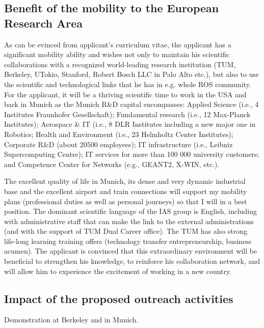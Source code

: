 \subsection{Benefit of the mobility to the European Research Area} 
As  can be  evinced from  applicant's curriculum  vitae, the applicant  
has  a significant mobility  ability  and  wishes  not  only to  maintain  his  scientific
collaborations  with a  recognized world-leading  research institution
(TUM, Berkeley, UTokio, Stanford, Robert Bosch LLC in Palo
Alto etc.), but also  to use the  scientific and  technological links
that he has in e.g. whole ROS community. For the applicant, it will  be 
a thriving scientific time to work in  the USA and back in Munich as  
the Munich R\&D capital encompasses:   Applied   Science   (i.e.,  4   Institutes   Fraunhofer
Gesellschaft); Fundamental research  (i.e., 12 Max-Planck Institutes);
Aerospace \&  IT (i.e., 8 DLR  Institutes including a new  major one in
Robotics;   Health  and   Environment  (i.e.,   23   Helmholtz  Center
Institutes); Corporate R\&D  (about 20500 employees); IT infrastructure
(i.e., Leibniz  Supercomputing Centre); IT services for  more than 100
000 university  customers; and  Competence Center for  Networks (e.g.,
GEANT2, X-WIN,  etc.).  

The excellent  quality of life in  Munich, its
dense and very  dynamic industrial base and the  excellent airport and
train connections will support  my mobility plans (professional duties
as well as  personal journeys) so that I will in  a best position. The
dominant scientific  language of the IAS group  is English, including
with  administrative staff  that can  make  the link  to the  external
administrations (and with the support  of TUM Dual Career office). The
TUM  has also  strong life-long  learning training  offers (technology
transfer entrepreneurship, business acumen).   The applicant is convinced that this
extraordinary  environment   will  be  beneficial   to  strengthen  his
knowledge, to reinforce his collaboration network, and will allow him to
experience the excitement of working in a new country.
\subsection{Impact of the proposed outreach activities}
Demonstration at Berkeley and in Munich.
\newpage